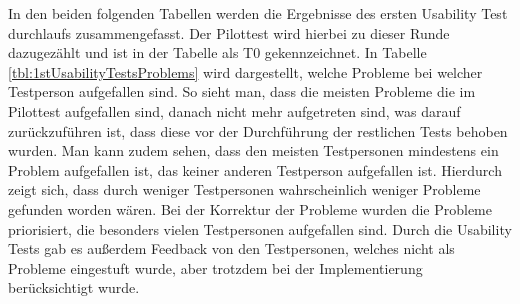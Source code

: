 In den beiden folgenden Tabellen werden die Ergebnisse des ersten Usability Test durchlaufs zusammengefasst. Der Pilottest wird hierbei zu dieser Runde dazugezählt und ist in der Tabelle als T0 gekennzeichnet. In Tabelle \ref{tbl:1stUsabilityTestsProblems} wird dargestellt, welche Probleme bei welcher Testperson aufgefallen sind. So sieht man, dass die meisten Probleme die im Pilottest aufgefallen sind, danach nicht mehr aufgetreten sind, was darauf zurückzuführen ist, dass diese vor der Durchführung der restlichen Tests behoben wurden. Man kann zudem sehen, dass den meisten Testpersonen mindestens ein Problem aufgefallen ist, das keiner anderen Testperson aufgefallen ist. Hierdurch zeigt sich, dass durch weniger Testpersonen wahrscheinlich weniger Probleme gefunden worden wären. Bei der Korrektur der Probleme wurden die Probleme priorisiert, die besonders vielen Testpersonen aufgefallen sind. Durch die Usability Tests gab es außerdem Feedback von den Testpersonen, welches nicht als Probleme eingestuft wurde, aber trotzdem bei der Implementierung berücksichtigt wurde.

